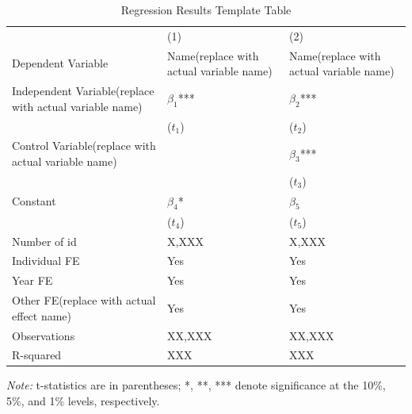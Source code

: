 \begin{table}[htbp]
    \caption{Regression Results Template Table}
    \label{Use the regression name as the label}
    \centering
    \begin{tabular}{p{5cm}p{3cm}p{3cm}} %
    \toprule
    & (1) & (2) \\
    Dependent Variable  & Name(replace with actual variable name)  & Name(replace with actual variable name) \\
    \midrule
    Independent Variable(replace with actual variable name)  & $\beta_1$*** & $\beta_2$*** \\ 
                & ($t_1$) & ($t_2$) \\
    Control Variable(replace with actual variable name)     &  & $\beta_3$*** \\  %
                &  & ($t_3$) \\
    Constant    & $\beta_4$* & $\beta_5$ \\
                & ($t_4$) & ($t_5$) \\
    
    Number of id       & X,XXX        & X,XXX \\
    Individual FE      & Yes         & Yes \\ %
    Year FE            & Yes         & Yes \\ %
    Other FE(replace with actual effect name)           & Yes         & Yes \\ %
    Observations       & XX,XXX       & XX,XXX \\
    R-squared          & XXX        & XXX \\
    \bottomrule
    \end{tabular}
    \begin{tablenotes}
    \small
    \item \textit{Note:} t-statistics are in parentheses; *, **, *** denote significance at the 10\%, 5\%, and 1\% levels, respectively.
    \end{tablenotes}
    \end{table}